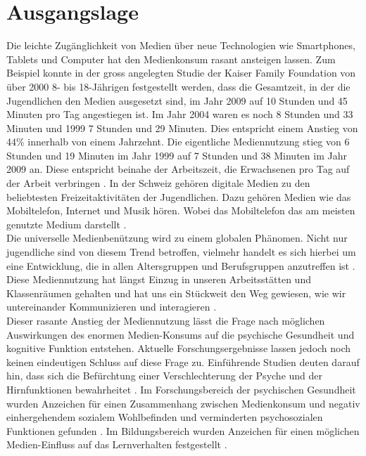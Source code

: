 \section{Ausgangslage}\label{section.einleitung.ausgangslage}
Die leichte Zugänglichkeit von Medien über neue Technologien wie Smartphones, Tablets und Computer hat den Medienkonsum rasant ansteigen lassen. Zum Beispiel konnte in der gross angelegten Studie der Kaiser Family Foundation \cite{Rideout2010} von über 2000 8- bis 18-Jährigen festgestellt werden, dass die Gesamtzeit, in der die Jugendlichen den Medien ausgesetzt sind, im Jahr 2009 auf 10 Stunden und 45 Minuten pro Tag angestiegen ist. Im Jahr 2004 waren es noch 8 Stunden und 33 Minuten und 1999 7 Stunden und 29 Minuten. Dies entspricht einem Anstieg von 44\% innerhalb von einem Jahrzehnt. Die eigentliche Mediennutzung stieg von 6 Stunden und 19 Minuten im Jahr 1999 auf 7 Stunden und 38 Minuten im Jahr 2009 an. Diese entspricht beinahe der Arbeitszeit, die Erwachsenen pro Tag auf der Arbeit verbringen \cite{Rideout2010}. In der Schweiz gehören digitale Medien zu den beliebtesten Freizeitaktivitäten der Jugendlichen. Dazu gehören Medien wie das Mobiltelefon, Internet und Musik hören. Wobei das Mobiltelefon das am meisten genutzte Medium darstellt \cite{Willemse2012}. \\
Die universelle Medienbenützung wird zu einem globalen Phänomen. Nicht nur jugendliche sind von diesem Trend betroffen, vielmehr handelt es sich hierbei um eine Entwicklung, die in allen Altersgruppen und Berufsgruppen anzutreffen ist \cite{Rogers2009}. Diese Mediennutzung hat längst Einzug in unseren Arbeitsstätten und Klassenräumen gehalten und hat uns ein Stückweit den Weg gewiesen, wie wir untereinander Kommunizieren und interagieren \cite{Benson2002}.\\
Dieser rasante Anstieg der Mediennutzung lässt die Frage nach möglichen Auswirkungen des enormen Medien-Konsums auf die psychische Gesundheit und kognitive Funktion entstehen. Aktuelle Forschungsergebnisse lassen jedoch noch keinen eindeutigen Schluss auf diese Frage zu. Einführende Studien deuten darauf hin, dass sich die Befürchtung einer Verschlechterung der Psyche und der Hirnfunktionen bewahrheitet \cite{Biocca2000, Roberts2008}. Im Forschungsbereich der psychischen Gesundheit wurden Anzeichen für einen Zusammenhang zwischen Medienkonsum und negativ einhergehendem sozialem Wohlbefinden und verminderten psychosozialen Funktionen gefunden \cite{Kraut1998, Moody2001}. Im Bildungsbereich wurden Anzeichen für einen möglichen Medien-Einfluss auf das Lernverhalten festgestellt \cite{Prensky2001}.\\
